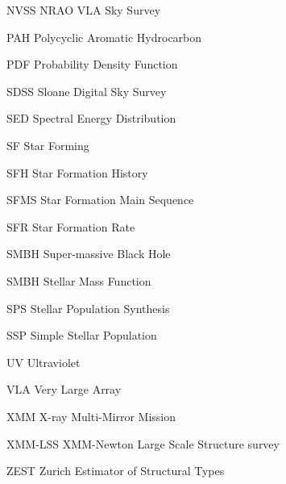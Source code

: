 \begin{abbreviations}
    \item[NVSS] {NRAO VLA Sky Survey}
    \item[PAH] {Polycyclic Aromatic Hydrocarbon}
    \item[PDF] {Probability Density Function}
    \item[SDSS] {Sloane Digital Sky Survey}
    \item[SED] {Spectral Energy Distribution}
    \item[SF] {Star Forming}
    \item[SFH] {Star Formation History}
    \item[SFMS] {Star Formation Main Sequence}
    \item[SFR] {Star Formation Rate}
    \item[SMBH] {Super-massive Black Hole}
    \item[SMBH] {Stellar Mass Function}
    \item[SPS] {Stellar Population Synthesis}
    \item[SSP] {Simple Stellar Population}
    \item[UV] {Ultraviolet }
    \item[VLA] {Very Large Array}
    \item[XMM] {X-ray Multi-Mirror Mission}
    \item[XMM-LSS] {XMM-Newton Large Scale Structure survey}
    \item[ZEST] {Zurich Estimator of Structural Types}
    
    
\end{abbreviations}


